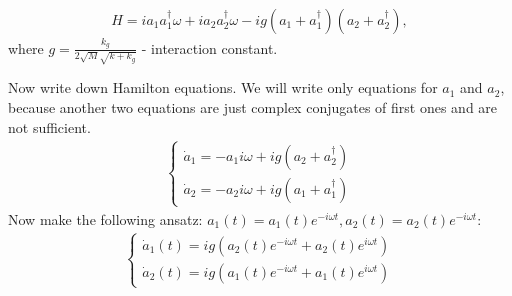 \documentclass[]{article}
\begin{document}
\begin{align*}
	H=i a_1 a_1^\dag \omega + i a_2 a_2^\dag \omega - ig(a_1+a_1^\dag)(a_2+a_2^\dag),
\end{align*}
where $g = \frac{k_g}{2\sqrt{M}\sqrt{k+k_g}}$ - interaction constant.\newline

Now write down Hamilton equations. We will write only equations for $a_1$ and $a_2$, because another two equations are just complex conjugates of first ones and are not sufficient.
\begin{align*}
	\begin{cases}
		\dot a_1 = -a_1 i \omega + ig(a_2 + a_2^\dag)
		\\
		\dot a_2 = -a_2 i \omega + ig(a_1 + a_1^\dag)
	\end{cases}
\end{align*}
Now make the following ansatz: $a_1(t) = a_1(t)e^{-i\omega t}, a_2(t) = a_2(t)e^{-i\omega t}$:
\begin{align*}
	\begin{cases}
		\dot a_1(t) = ig(a_2(t)e^{-i\omega t} + a_2(t)e^{i\omega t})
		\\
		\dot a_2(t) = ig(a_1(t)e^{-i\omega t} + a_1(t)e^{i\omega t})
	\end{cases}
\end{align*}
\end{document}
